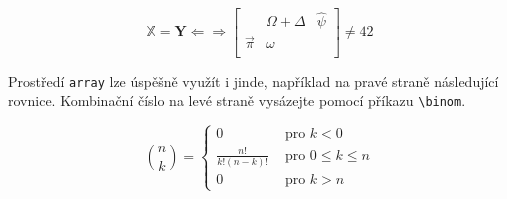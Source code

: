 \documentclass[a4paper, twocolumn, 11pt]{article}
\theoremstyle{plain}
\begin{document}
\begin{displaymath}
	\mathbb{X} = \mathbf{Y} \Leftarrow \! \Rightarrow
	\left[ \begin{array}{ccc}
			          & \Omega + \Delta & \hat{\psi} \\
			\vec{\pi} & \omega          &            \\
		\end{array} \right] \neq{} 42
\end{displaymath}

Prostředí \texttt{array} lze úspěšně využít i jinde,
například na pravé straně následující rovnice.
Kombinační číslo na levé straně vysázejte pomocí příkazu \verb|\binom|.

\begin{displaymath}
	\binom{n}{k} = \left\{ \begin{array}{cl}
		0                   & \text{ pro } k < 0           \\
		\frac{n!}{k!(n-k)!} & \text{ pro } 0 \leq k \leq n \\
		0                   & \text{ pro } k > n
	\end{array} \right.
\end{displaymath}
\end{document}
